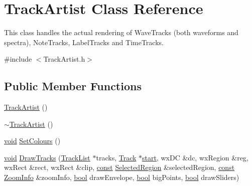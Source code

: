 \hypertarget{class_track_artist}{}\section{Track\+Artist Class Reference}
\label{class_track_artist}


This class handles the actual rendering of Wave\+Tracks (both waveforms and spectra), Note\+Tracks, Label\+Tracks and Time\+Tracks.  




{\ttfamily \#include $<$Track\+Artist.\+h$>$}

\subsection*{Public Member Functions}
\begin{DoxyCompactItemize}
\item 
\hyperlink{class_track_artist_a1523a85e9f5d5400bde1cd3e3fbf3413}{Track\+Artist} ()
\item 
\hyperlink{class_track_artist_a5e33cdb8a68a1cd9a7381c6b93f4422f}{$\sim$\+Track\+Artist} ()
\item 
\hyperlink{sound_8c_ae35f5844602719cf66324f4de2a658b3}{void} \hyperlink{class_track_artist_add49089e256d22507061e90e71841d0c}{Set\+Colours} ()
\item 
\hyperlink{sound_8c_ae35f5844602719cf66324f4de2a658b3}{void} \hyperlink{class_track_artist_aecb43569c2de2e9e2cae4584ffd80a5f}{Draw\+Tracks} (\hyperlink{class_track_list}{Track\+List} $\ast$tracks, \hyperlink{class_track}{Track} $\ast$\hyperlink{seqread_8c_ac503262ae470564980711da4f78b1181}{start}, wx\+DC \&dc, wx\+Region \&reg, wx\+Rect \&rect, wx\+Rect \&clip, \hyperlink{getopt1_8c_a2c212835823e3c54a8ab6d95c652660e}{const} \hyperlink{class_selected_region}{Selected\+Region} \&selected\+Region, \hyperlink{getopt1_8c_a2c212835823e3c54a8ab6d95c652660e}{const} \hyperlink{class_zoom_info}{Zoom\+Info} \&zoom\+Info, \hyperlink{mac_2config_2i386_2lib-src_2libsoxr_2soxr-config_8h_abb452686968e48b67397da5f97445f5b}{bool} draw\+Envelope, \hyperlink{mac_2config_2i386_2lib-src_2libsoxr_2soxr-config_8h_abb452686968e48b67397da5f97445f5b}{bool} big\+Points, \hyperlink{mac_2config_2i386_2lib-src_2libsoxr_2soxr-config_8h_abb452686968e48b67397da5f97445f5b}{bool} draw\+Sliders)
\item 

\end{DoxyCompactItemize}
